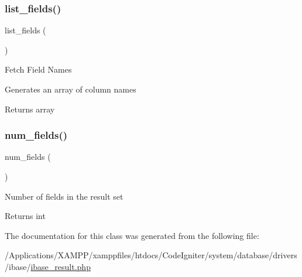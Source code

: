 \subsubsection{\texorpdfstring{list\+\_\+fields()}{list\_fields()}}
{\footnotesize\ttfamily list\+\_\+fields (\begin{DoxyParamCaption}{ }\end{DoxyParamCaption})}

Fetch Field Names

Generates an array of column names

\begin{DoxyReturn}{Returns}
array 
\end{DoxyReturn}
\mbox{\label{class_c_i___d_b__ibase__result_af831bf363e4d7d661a717a4932af449d}} 
\subsubsection{\texorpdfstring{num\+\_\+fields()}{num\_fields()}}
{\footnotesize\ttfamily num\+\_\+fields (\begin{DoxyParamCaption}{ }\end{DoxyParamCaption})}

Number of fields in the result set

\begin{DoxyReturn}{Returns}
int 
\end{DoxyReturn}


The documentation for this class was generated from the following file\+:\begin{DoxyCompactItemize}
\item 
/\+Applications/\+X\+A\+M\+P\+P/xamppfiles/htdocs/\+Code\+Igniter/system/database/drivers/ibase/\mbox{\hyperlink{ibase__result_8php}{ibase\+\_\+result.\+php}}\end{DoxyCompactItemize}
